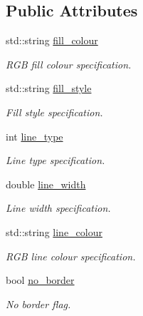 \subsection*{Public Attributes}
\begin{DoxyCompactItemize}
\item 
\hypertarget{a00424_ab7448164de405d473cf06cca4bb97812}{std\-::string \hyperlink{a00424_ab7448164de405d473cf06cca4bb97812}{fill\-\_\-colour}}\label{a00424_ab7448164de405d473cf06cca4bb97812}

\begin{DoxyCompactList}\small\item\em R\-G\-B fill colour specification. \end{DoxyCompactList}\item 
\hypertarget{a00424_afe5ce4d37cda72ee7e042bfbabf0bd2d}{std\-::string \hyperlink{a00424_afe5ce4d37cda72ee7e042bfbabf0bd2d}{fill\-\_\-style}}\label{a00424_afe5ce4d37cda72ee7e042bfbabf0bd2d}

\begin{DoxyCompactList}\small\item\em Fill style specification. \end{DoxyCompactList}\item 
\hypertarget{a00424_a8250cb269bb7d4861dae6845518aa6df}{int \hyperlink{a00424_a8250cb269bb7d4861dae6845518aa6df}{line\-\_\-type}}\label{a00424_a8250cb269bb7d4861dae6845518aa6df}

\begin{DoxyCompactList}\small\item\em Line type specification. \end{DoxyCompactList}\item 
\hypertarget{a00424_a0f65bd43af5f7b207b6d984f5db60bb0}{double \hyperlink{a00424_a0f65bd43af5f7b207b6d984f5db60bb0}{line\-\_\-width}}\label{a00424_a0f65bd43af5f7b207b6d984f5db60bb0}

\begin{DoxyCompactList}\small\item\em Line width specification. \end{DoxyCompactList}\item 
\hypertarget{a00424_a6723e01a096531cca1e874ce900d4354}{std\-::string \hyperlink{a00424_a6723e01a096531cca1e874ce900d4354}{line\-\_\-colour}}\label{a00424_a6723e01a096531cca1e874ce900d4354}

\begin{DoxyCompactList}\small\item\em R\-G\-B line colour specification. \end{DoxyCompactList}\item 
\hypertarget{a00424_a4df93703247f88e98a87006a2abeb597}{bool \hyperlink{a00424_a4df93703247f88e98a87006a2abeb597}{no\-\_\-border}}\label{a00424_a4df93703247f88e98a87006a2abeb597}

\begin{DoxyCompactList}\small\item\em No border flag. \end{DoxyCompactList}\end{DoxyCompactItemize}


